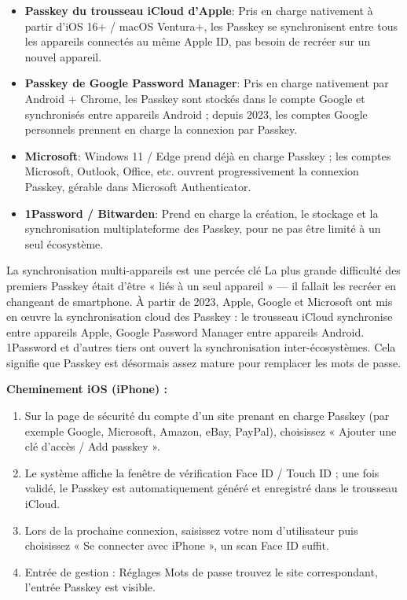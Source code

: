 \begin{itemize}
  \item \textbf{Passkey du trousseau iCloud d'Apple}: Pris en charge nativement à partir d'iOS 16+ / macOS Ventura+, les Passkey se synchronisent entre tous les appareils connectés au même Apple ID, pas besoin de recréer sur un nouvel appareil.
  \item \textbf{Passkey de Google Password Manager}: Pris en charge nativement par Android + Chrome, les Passkey sont stockés dans le compte Google et synchronisés entre appareils Android ; depuis 2023, les comptes Google personnels prennent en charge la connexion par Passkey.
  \item \textbf{Microsoft}: Windows 11 / Edge prend déjà en charge Passkey ; les comptes Microsoft, Outlook, Office, etc. ouvrent progressivement la connexion Passkey, gérable dans Microsoft Authenticator.
  \item \textbf{1Password / Bitwarden}: Prend en charge la création, le stockage et la synchronisation multiplateforme des Passkey, pour ne pas être limité à un seul écosystème.
\end{itemize}

\begin{tcbinfo}{La synchronisation multi-appareils est une percée clé}
La plus grande difficulté des premiers Passkey était d'être « liés à un seul appareil » — il fallait les recréer en changeant de smartphone. À partir de 2023, Apple, Google et Microsoft ont mis en œuvre la synchronisation cloud des Passkey : le trousseau iCloud synchronise entre appareils Apple, Google Password Manager entre appareils Android. 1Password et d'autres tiers ont ouvert la synchronisation inter-écosystèmes. Cela signifie que Passkey est désormais assez mature pour remplacer les mots de passe.

\end{tcbinfo}


\textbf{Cheminement iOS (iPhone) :}

\begin{enumerate}
  \item Sur la page de sécurité du compte d'un site prenant en charge Passkey (par exemple Google, Microsoft, Amazon, eBay, PayPal), choisissez « Ajouter une clé d'accès / Add passkey ».
  \item Le système affiche la fenêtre de vérification Face ID / Touch ID ; une fois validé, le Passkey est automatiquement généré et enregistré dans le trousseau iCloud.
  \item Lors de la prochaine connexion, saisissez votre nom d'utilisateur puis choisissez « Se connecter avec iPhone », un scan Face ID suffit.
  \item Entrée de gestion : Réglages Mots de passe trouvez le site correspondant, l'entrée Passkey est visible.
\end{enumerate}

